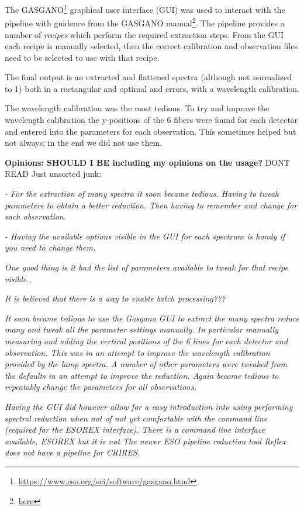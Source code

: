 The GASGANO\footnote{\href{https://www.eso.org/sci/software/gasgano.html}{https://www.eso.org/sci/software/gasgano.html}} graphical user interface (GUI) was used to interact with the pipeline with guidence from the GASGANO manual\footnote{\href{here}{here}}. The pipeline provides a number of \emph{recipes} which perform the required extraction steps. From the GUI each recipe is manually selected, then the correct calibration and observation files need to be selected to use with that recipe.  

The final output is an extracted and flattened spectra (although not normalized to 1) both in a rectangular and optimal and errors, with a wavelength calibration.

The wavelength calibration was the most tedious. To try and improve the wavelength calibration the {y-positions} of the 6 {\thar} fibers were found for each detector and entered into the parameters for each observation. This sometimes helped but not always; in the end we did not use them.


\textbf{Opinions: SHOULD I BE including my opinions on the usage?}
DONT READ Just unsorted junk: 

\textit{- For the extraction of many spectra it soon became tedious. Having to tweak parameters to obtain a better reduction. Then having to remember and change for each observation. }

\textit{- Having the available options visible in the GUI for each spectrum is handy if you need to change them.}



\textit{One good thing is it had the list of parameters available to tweak for that recipe visible..}

\textit{It is believed that there is a way to enable batch processing???}

\textit{It soon became tedious to use the Gasgano GUI to extract the many spectra reduce many and tweak all the parameter settings manually. In particular manually measuring and adding the vertical positions of the 6 {\thar} lines for each detector and observation. This was in an attempt to improve the wavelength calibration provided by the {\thar} lamp spectra.
A number of other parameters were tweaked from the defaults in an attempt to improve the reduction. Again become tedious to repeatably change the parameters for all observations.}

\textit{Having the GUI did however allow for a easy introduction into using performing spectral reduction when not of not yet comfortable with the command line (required for the ESOREX interface).
There is a command line interface available, ESOREX but it is not The newer ESO pipeline reduction tool Reflex does not have a pipeline for CRIRES. }

